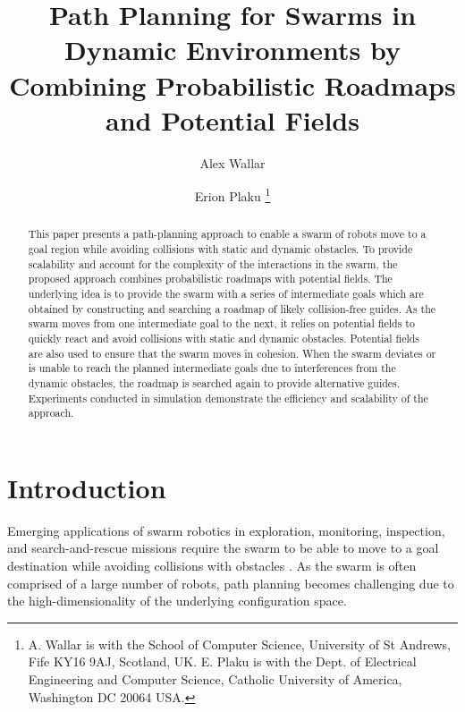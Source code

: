 \documentclass[letterpaper, 10pt, conference]{ieeeconf}
\begin{document}
\title{Path Planning for Swarms in Dynamic Environments by\\ Combining Probabilistic Roadmaps and
  Potential Fields}


\author{Alex Wallar \and Erion Plaku
\thanks{A. Wallar is with the School of Computer Science,
  University of St Andrews, Fife KY16 9AJ, Scotland, UK. E. Plaku is with the
  Dept. of Electrical Engineering and Computer Science, Catholic
  University of America, Washington DC 20064 USA.
}}


\maketitle
\begin{abstract}
This paper presents a path-planning approach to enable a swarm of
robots move to a goal region while avoiding collisions with static and
dynamic obstacles.  To provide scalability and account for the
complexity of the interactions in the swarm, the proposed approach
combines probabilistic roadmaps with potential fields.  The underlying
idea is to provide the swarm with a series of intermediate goals which
are obtained by constructing and searching a roadmap of likely
collision-free guides. As the swarm moves from one intermediate goal
to the next, it relies on potential fields to quickly react and avoid
collisions with static and dynamic obstacles. Potential fields are
also used to ensure that the swarm moves in cohesion. When the swarm
deviates or is unable to reach the planned intermediate goals due to
interferences from the dynamic obstacles, the roadmap is searched again to
provide alternative guides. Experiments conducted in simulation
demonstrate the efficiency and scalability of the approach.
\end{abstract}


\section{Introduction}
\label{sec:Intro}

Emerging applications of swarm robotics in exploration, monitoring,
inspection, and search-and-rescue missions require the swarm to be
able to move to a goal destination while avoiding collisions with
obstacles \cite{swarm,swarmReview12}.  As the swarm is often comprised
of a large number of robots, path planning becomes challenging due to
the high-dimensionality of the underlying configuration space.
\end{document}
